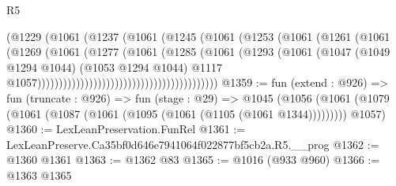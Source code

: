 \begin{lexlean}{R5}
\begin{coremodule}
                                                  (@1229
                                                    (@1061
                                                      (@1237
                                                        (@1061
                                                          (@1245
                                                            (@1061
                                                              (@1253
                                                                (@1061
                                                                  (@1261
                                                                    (@1061
                                                                      (@1269
                                                                        (@1061
                                                                          (@1277
                                                                            (@1061
                                                                              (@1285
                                                                                (@1061
                                                                                  (@1293
                                                                                    (@1061
                                                                                      (@1047
                                                                                        (@1049
                                                                                          @1294
                                                                                          @1044)
                                                                                        (@1053
                                                                                          @1294
                                                                                          @1044)
                                                                                        @1117
                                                                                        @1057))))))))))))))))))))))))))))))))))))))))))
@1359 := fun (extend : @926) =>
  fun (truncate : @926) =>
  fun (stage : @29) =>
  @1045 (@1056 (@1061 (@1079 (@1061 (@1087 (@1061 (@1095 (@1061 (@1105 (@1061 @1344))))))))) @1057)
@1360 := LexLeanPreservation.FunRel
@1361 := LexLeanPreserve.Ca35bf0d646e7941064f022877bf5cb2a.R5.__prog
@1362 := @1360 @1361
@1363 := @1362 @83
@1365 := @1016 (@933 @960)
@1366 := @1363 @1365

\end{coremodule}
\end{lexlean}
